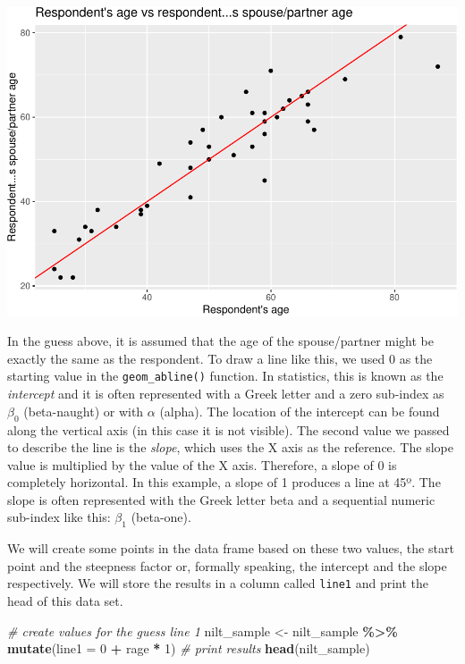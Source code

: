 \documentclass[
]{book}
\newenvironment{Shaded}{\begin{snugshade}}{\end{snugshade}}
\newcommand{\AttributeTok}[1]{\textcolor[rgb]{0.13,0.29,0.53}{#1}}
\newcommand{\CommentTok}[1]{\textcolor[rgb]{0.56,0.35,0.01}{\textit{#1}}}
\newcommand{\DecValTok}[1]{\textcolor[rgb]{0.00,0.00,0.81}{#1}}
\newcommand{\FunctionTok}[1]{\textcolor[rgb]{0.13,0.29,0.53}{\textbf{#1}}}
\newcommand{\NormalTok}[1]{#1}
\newcommand{\OtherTok}[1]{\textcolor[rgb]{0.56,0.35,0.01}{#1}}
\newcommand{\SpecialCharTok}[1]{\textcolor[rgb]{0.81,0.36,0.00}{\textbf{#1}}}
\begin{document}
\begin{flushleft}\includegraphics[width=1\linewidth]{lab-workbook_files/figure-latex/unnamed-chunk-86-1} \end{flushleft}

In the guess above, it is assumed that the age of the spouse/partner might be exactly the same as the respondent. To draw a line like this, we used 0 as the starting value in the \texttt{geom\_abline()} function. In statistics, this is known as the \emph{intercept} and it is often represented with a Greek letter and a zero sub-index as \(\beta_0\) (beta-naught) or with \(\alpha\) (alpha). The location of the intercept can be found along the vertical axis (in this case it is not visible). The second value we passed to describe the line is the \emph{slope}, which uses the X axis as the reference. The slope value is multiplied by the value of the X axis. Therefore, a slope of 0 is completely horizontal. In this example, a slope of 1 produces a line at 45º. The slope is often represented with the Greek letter beta and a sequential numeric sub-index like this: \(\beta_1\) (beta-one).

We will create some points in the data frame based on these two values, the start point and the steepness factor or, formally speaking, the intercept and the slope respectively. We will store the results in a column called \texttt{line1} and print the head of this data set.

\begin{Shaded}
\begin{Highlighting}[]
\CommentTok{\# create values for the guess line 1}
\NormalTok{nilt\_sample }\OtherTok{\textless{}{-}}\NormalTok{ nilt\_sample }\SpecialCharTok{\%\textgreater{}\%} 
  \FunctionTok{mutate}\NormalTok{(}\AttributeTok{line1 =} \DecValTok{0} \SpecialCharTok{+}\NormalTok{ rage }\SpecialCharTok{*} \DecValTok{1}\NormalTok{)}
\CommentTok{\# print results}
\FunctionTok{head}\NormalTok{(nilt\_sample)}
\end{Highlighting}
\end{Shaded}
\end{document}
